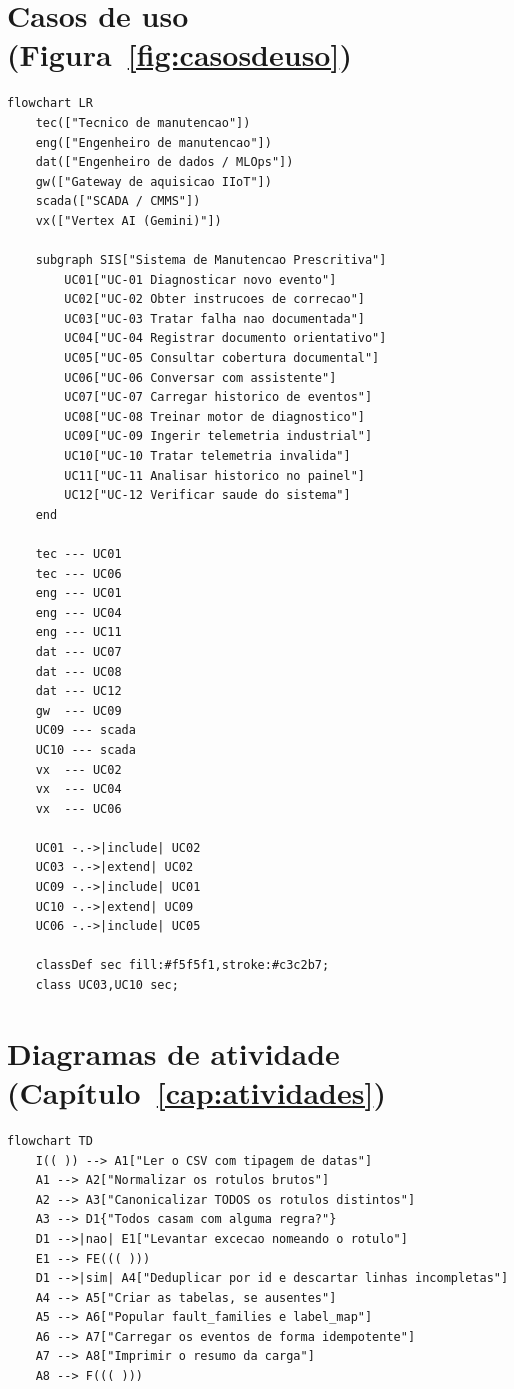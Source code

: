 \section{Casos de uso (Figura~\ref{fig:casosdeuso})}

\begin{lstlisting}[language=mermaid, caption={Casos de uso --- aproximação em grafo (Mermaid não implementa a notação UML de casos de uso)}, label={lst:mmuc}]
flowchart LR
    tec(["Tecnico de manutencao"])
    eng(["Engenheiro de manutencao"])
    dat(["Engenheiro de dados / MLOps"])
    gw(["Gateway de aquisicao IIoT"])
    scada(["SCADA / CMMS"])
    vx(["Vertex AI (Gemini)"])

    subgraph SIS["Sistema de Manutencao Prescritiva"]
        UC01["UC-01 Diagnosticar novo evento"]
        UC02["UC-02 Obter instrucoes de correcao"]
        UC03["UC-03 Tratar falha nao documentada"]
        UC04["UC-04 Registrar documento orientativo"]
        UC05["UC-05 Consultar cobertura documental"]
        UC06["UC-06 Conversar com assistente"]
        UC07["UC-07 Carregar historico de eventos"]
        UC08["UC-08 Treinar motor de diagnostico"]
        UC09["UC-09 Ingerir telemetria industrial"]
        UC10["UC-10 Tratar telemetria invalida"]
        UC11["UC-11 Analisar historico no painel"]
        UC12["UC-12 Verificar saude do sistema"]
    end

    tec --- UC01
    tec --- UC06
    eng --- UC01
    eng --- UC04
    eng --- UC11
    dat --- UC07
    dat --- UC08
    dat --- UC12
    gw  --- UC09
    UC09 --- scada
    UC10 --- scada
    vx  --- UC02
    vx  --- UC04
    vx  --- UC06

    UC01 -.->|include| UC02
    UC03 -.->|extend| UC02
    UC09 -.->|include| UC01
    UC10 -.->|extend| UC09
    UC06 -.->|include| UC05

    classDef sec fill:#f5f5f1,stroke:#c3c2b7;
    class UC03,UC10 sec;
\end{lstlisting}

\section{Diagramas de atividade (Capítulo~\ref{cap:atividades})}

\begin{lstlisting}[language=mermaid, caption={AT-01 --- carga do histórico corporativo}, label={lst:mmat01}]
flowchart TD
    I(( )) --> A1["Ler o CSV com tipagem de datas"]
    A1 --> A2["Normalizar os rotulos brutos"]
    A2 --> A3["Canonicalizar TODOS os rotulos distintos"]
    A3 --> D1{"Todos casam com alguma regra?"}
    D1 -->|nao| E1["Levantar excecao nomeando o rotulo"]
    E1 --> FE((( )))
    D1 -->|sim| A4["Deduplicar por id e descartar linhas incompletas"]
    A4 --> A5["Criar as tabelas, se ausentes"]
    A5 --> A6["Popular fault_families e label_map"]
    A6 --> A7["Carregar os eventos de forma idempotente"]
    A7 --> A8["Imprimir o resumo da carga"]
    A8 --> F((( )))
\end{lstlisting}

